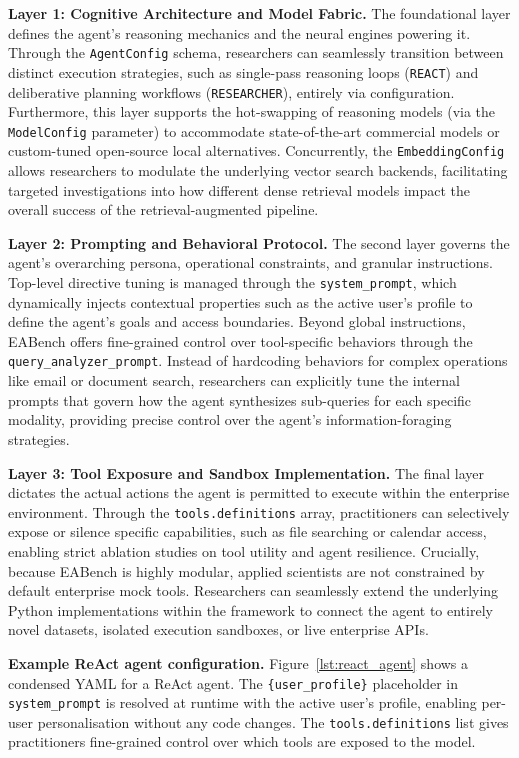 \documentclass[journal,dvipsnames]{acmart}
\begin{document}
\textbf{Layer 1: Cognitive Architecture and Model Fabric.}
The foundational layer defines the agent's reasoning mechanics and the neural engines powering it. Through the \texttt{AgentConfig} schema, researchers can seamlessly transition between distinct execution strategies, such as single-pass reasoning loops (\texttt{REACT}) and deliberative planning workflows (\texttt{RESEARCHER}), entirely via configuration. Furthermore, this layer supports the hot-swapping of reasoning models (via the \texttt{ModelConfig} parameter) to accommodate state-of-the-art commercial models or custom-tuned open-source local alternatives. Concurrently, the \texttt{EmbeddingConfig} allows researchers to modulate the underlying vector search backends, facilitating targeted investigations into how different dense retrieval models impact the overall success of the retrieval-augmented pipeline.

\textbf{Layer 2: Prompting and Behavioral Protocol.}
The second layer governs the agent's overarching persona, operational constraints, and granular instructions. Top-level directive tuning is managed through the \texttt{system\_prompt}, which dynamically injects contextual properties such as the active user's profile to define the agent's goals and access boundaries. Beyond global instructions, EABench offers fine-grained control over tool-specific behaviors through the \texttt{query\_analyzer\_prompt}. Instead of hardcoding behaviors for complex operations like email or document search, researchers can explicitly tune the internal prompts that govern how the agent synthesizes sub-queries for each specific modality, providing precise control over the agent's information-foraging strategies.

\textbf{Layer 3: Tool Exposure and Sandbox Implementation.}
The final layer dictates the actual actions the agent is permitted to execute within the enterprise environment. Through the \texttt{tools.definitions} array, practitioners can selectively expose or silence specific capabilities, such as file searching or calendar access, enabling strict ablation studies on tool utility and agent resilience. Crucially, because EABench is highly modular, applied scientists are not constrained by default enterprise mock tools. Researchers can seamlessly extend the underlying Python implementations within the framework to connect the agent to entirely novel datasets, isolated execution sandboxes, or live enterprise APIs.

\textbf{Example ReAct agent configuration.}
Figure~\ref{lst:react_agent} shows a condensed YAML for a ReAct agent.
The \texttt{\{user\_profile\}} placeholder in \texttt{system\_prompt} is
resolved at runtime with the active user's profile, enabling per-user
personalisation without any code changes.
The \texttt{tools.definitions} list gives practitioners fine-grained
control over which tools are exposed to the model.
\end{document}

